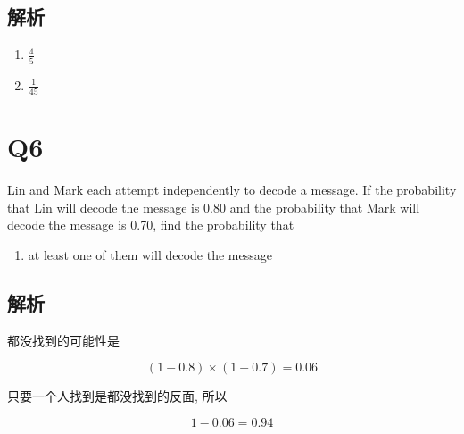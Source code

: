   \subsection{解析}

    \begin{enumerate}
      \item $ \frac{4}{5} $
      \item $ \frac{1}{45} $
    \end{enumerate}

\section{Q6}

  Lin and Mark each attempt independently to decode a message.
  If the probability that Lin will decode the message is 0.80 and the
  probability that Mark will decode the message is 0.70,
  find the probability that

  \begin{enumerate}
    \item at least one of them will decode the message
  \end{enumerate}

  \subsection{解析}

    都没找到的可能性是

    \begin{equation*}
      \left( 1 - 0.8 \right) \times \left( 1 - 0.7 \right) = 0.06
    \end{equation*}

    只要一个人找到是都没找到的反面, 所以

    \begin{equation*}
      1 - 0.06 = 0.94
    \end{equation*}
